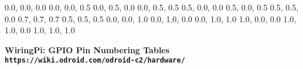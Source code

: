 \documentclass[11pt,a4paper]{article}
\begin{document}
\begin{sffamily}
\definecolor{rtb-black}{rgb}  {0.0, 0.0, 0.0}
\definecolor{rtb-navy}{rgb}   {0.0, 0.0, 0.5}
\definecolor{rtb-green}{rgb}  {0.0, 0.5, 0.0}
\definecolor{rtb-teal}{rgb}   {0.0, 0.5, 0.5}
\definecolor{rtb-maroon}{rgb} {0.5, 0.0, 0.0}
\definecolor{rtb-purple}{rgb} {0.5, 0.0, 0.5}
\definecolor{rtb-olive}{rgb}  {0.5, 0.5, 0.0}
\definecolor{rtb-silver}{rgb} {0.7, 0.7, 0.7}
\definecolor{rtb-grey}{rgb}   {0.5, 0.5, 0.5}
\definecolor{rtb-blue}{rgb}   {0.0, 0.0, 1.0}
\definecolor{rtb-lime}{rgb}   {0.0, 1.0, 0.0}
\definecolor{rtb-aqua}{rgb}   {0.0, 1.0, 1.0}
\definecolor{rtb-red}{rgb}    {1.0, 0.0, 0.0}
\definecolor{rtb-yellow}{rgb} {1.0, 1.0, 0.0}
\definecolor{rtb-white}{rgb}  {1.0, 1.0, 1.0}

\begin{center}
\bfseries{WiringPi: GPIO Pin Numbering Tables}\\
\tt{https://wiki.odroid.com/odroid-c2/hardware/}
\end{center}


\end{sffamily}
\end{document}
